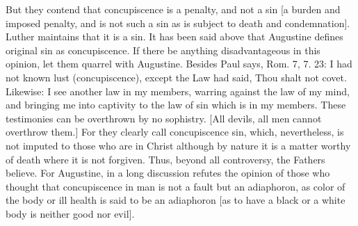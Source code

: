 But they contend that concupiscence is a penalty, and not a sin [a
burden and imposed penalty, and is not such a sin as is subject to
death and condemnation].  Luther maintains that it is a sin.  It has
been said above that Augustine defines original sin as concupiscence.
If there be anything disadvantageous in this opinion, let them
quarrel with Augustine.  Besides Paul says, Rom. 7, 7. 23: I had not
known lust (concupiscence), except the Law had said, Thou shalt not
covet.  Likewise: I see another law in my members, warring against
the law of my mind, and bringing me into captivity to the law of sin
which is in my members.  These testimonies can be overthrown by no
sophistry.  [All devils, all men cannot overthrow them.] For they
clearly call concupiscence sin, which, nevertheless, is not imputed
to those who are in Christ although by nature it is a matter worthy
of death where it is not forgiven.  Thus, beyond all controversy, the
Fathers believe.  For Augustine, in a long discussion refutes the
opinion of those who thought that concupiscence in man is not a fault
but an adiaphoron, as color of the body or ill health is said to be
an adiaphoron [as to have a black or a white body is neither good nor
evil].

